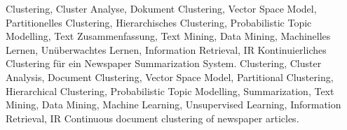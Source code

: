\HAWAbstractPage
  {
    Clustering, 
    Cluster Analyse, 
    Dokument Clustering, Vector Space Model,
    Partitionelles Clustering,
    Hierarchisches Clustering,
    Probabilistic Topic Modelling, 
    Text Zusammenfassung,
    Text Mining, Data Mining,
    Machinelles Lernen, Unüberwachtes Lernen, 
    Information Retrieval, IR
  }
  { 
    Kontinuierliches Clustering für ein Newspaper Summarization System.
  }
  { 
    Clustering, 
    Cluster Analysis, 
    Document Clustering, Vector Space Model,
    Partitional Clustering,
    Hierarchical Clustering,
    Probabilistic Topic Modelling,
    Summarization,
    Text Mining, Data Mining,
    Machine Learning, Unsupervised Learning, 
    Information Retrieval, IR
  }
  {
    Continuous document clustering of newspaper articles.
  }